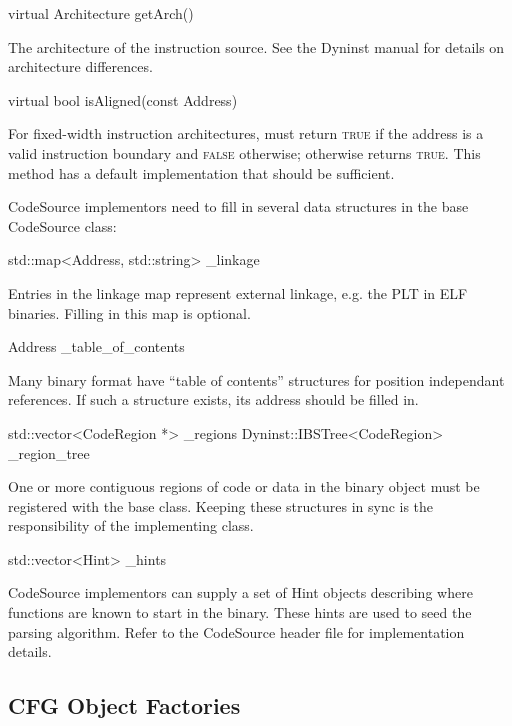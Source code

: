 \documentclass{article}
\newenvironment{apient}{\small\verbatim}{\endverbatim}
\newcommand{\apidesc}[1]{%
{\addtolength{\leftskip}{4em}%
#1\par\medskip}
}
\begin{document}
\begin{apient}
virtual Architecture getArch()
\end{apient}
\apidesc{The architecture of the instruction source. See the Dyninst manual for details on architecture differences.}

\begin{apient}
virtual bool isAligned(const Address)
\end{apient}
\apidesc{For fixed-width instruction architectures, must return {\scshape true} if the address is a valid instruction boundary and {\scshape false} otherwise; otherwise returns {\scshape true}. This method has a default implementation that should be sufficient.}

CodeSource implementors need to fill in several data structures in the base CodeSource class:

\begin{apient}
std::map<Address, std::string> _linkage
\end{apient}
\apidesc{Entries in the linkage map represent external linkage, e.g. the PLT in ELF binaries. Filling in this map is optional.}

\begin{apient}
Address _table_of_contents
\end{apient}
\apidesc{Many binary format have ``table of contents'' structures for position
independant references. If such a structure exists, its address should be filled in.}

\begin{apient}
std::vector<CodeRegion *> _regions
Dyninst::IBSTree<CodeRegion> _region_tree
\end{apient}
\apidesc{One or more contiguous regions of code or data in the binary object must be registered with the base class. Keeping these structures in sync is the responsibility of the implementing class.}

\begin{apient}
std::vector<Hint> _hints
\end{apient}
\apidesc{CodeSource implementors can supply a set of Hint objects describing where functions are known to start in the binary. These hints are used to seed the parsing algorithm. Refer to the CodeSource header file for implementation details.}

\subsection{CFG Object Factories}
\label{sec:factories}
\end{document}
